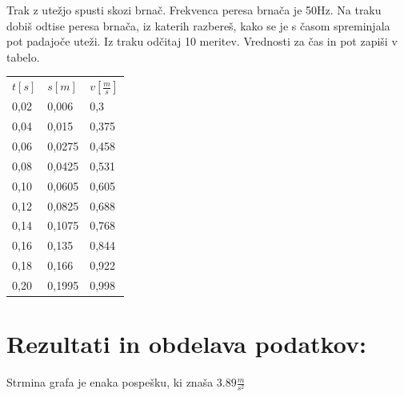\documentclass[a4paper]{article}
\begin{document}
Trak z utežjo spusti skozi brnač. Frekvenca peresa brnača je 50Hz. Na traku dobiš odtise peresa brnača, iz katerih razbereš, kako se je s časom spreminjala pot padajoče uteži. Iz traku odčitaj 10 meritev. Vrednosti za čas in pot zapiši v tabelo.


\begin{table}[H]
   \centering
\begin{tabular}{lll}
   $t[s]$ & $s[m]$ & $v[\frac{m}{s}]$ \\
0,02 & 0,006  & 0,3   \\
0,04 & 0,015  & 0,375 \\
0,06 & 0,0275 & 0,458 \\
0,08 & 0,0425 & 0,531 \\
0,10  & 0,0605 & 0,605 \\
0,12 & 0,0825 & 0,688 \\
0,14 & 0,1075 & 0,768 \\
0,16 & 0,135  & 0,844 \\
0,18 & 0,166  & 0,922 \\
0,20  & 0,1995 & 0,998
\end{tabular}
\end{table}



\section*{Rezultati in obdelava podatkov:}

\datatable

\begin{center}
\end{center}

Strmina grafa je enaka pospešku, ki znaša $3.89 \frac{m}{s^2}$
\end{document}
